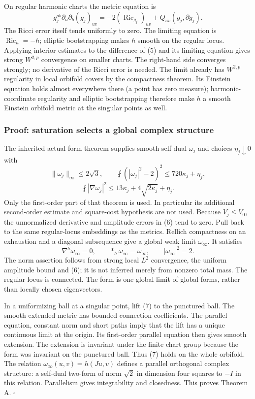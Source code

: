 \documentclass[
  11pt,
]{article}
\begin{document}
On regular harmonic charts the metric equation is \[
 g_j^{ab}\partial_a\partial_b(g_j)_{uv}
    =-2(\operatorname{Ric}_{g_j})_{uv}
                +Q_{uv}(g_j,\partial g_j).             \tag{5}
\] The Ricci error itself tends uniformly to zero. The limiting equation
is \(\operatorname{Ric}_h=-h\); elliptic bootstrapping makes \(h\)
smooth on the regular locus. Applying interior estimates to the
difference of (5) and its limiting equation gives strong \(W^{2,p}\)
convergence on smaller charts. The right-hand side converges strongly;
no derivative of the Ricci error is needed. The limit already has
\(W^{2,p}\) regularity in local orbifold covers by the compactness
theorem. Its Einstein equation holds almost everywhere there (a point
has zero measure); harmonic-coordinate regularity and elliptic
bootstrapping therefore make \(h\) a smooth Einstein orbifold metric at
the singular points as well.

\hypertarget{proof-saturation-selects-a-global-complex-structure}{%
\subsubsection{Proof: saturation selects a global complex
structure}\label{proof-saturation-selects-a-global-complex-structure}}

The inherited actual-form theorem supplies smooth self-dual \(\omega_j\)
and choices \(\eta_j\downarrow0\) with \[
 \|\omega_j\|_\infty\le2\sqrt3,\qquad
 \fint(|\omega_j|^2-2)^2\le720\kappa_j+\eta_j,
\] \[
 \fint|\nabla\omega_j|^2
       \le13\kappa_j+4\sqrt{2\kappa_j}+\eta_j.          \tag{6}
\] Only the first-order part of that theorem is used. In particular its
additional second-order estimate and square-cost hypothesis are not
used. Because \(V_j\le V_0\), the unnormalized derivative and amplitude
errors in (6) tend to zero. Pull back to the same regular-locus
embeddings as the metrics. Rellich compactness on an exhaustion and a
diagonal subsequence give a global weak limit \(\omega_\infty\). It
satisfies \[
 \nabla^h\omega_\infty=0,\qquad
 *_h\omega_\infty=\omega_\infty,\qquad
 |\omega_\infty|^2=2.                                  \tag{7}
\] The norm assertion follows from strong local \(L^2\) convergence, the
uniform amplitude bound and (6); it is not inferred merely from nonzero
total mass. The regular locus is connected. The form is one global limit
of global forms, rather than locally chosen eigenvectors.

In a uniformizing ball at a singular point, lift (7) to the punctured
ball. The smooth extended metric has bounded connection coefficients.
The parallel equation, constant norm and short paths imply that the lift
has a unique continuous limit at the origin. Its first-order parallel
equation then gives smooth extension. The extension is invariant under
the finite chart group because the form was invariant on the punctured
ball. Thus (7) holds on the whole orbifold. The relation
\(\omega_\infty(u,v)=h(Ju,v)\) defines a parallel orthogonal complex
structure: a self-dual two-form of norm \(\sqrt2\) in dimension four
squares to \(-I\) in this relation. Parallelism gives integrability and
closedness. This proves Theorem A. \(\square\)
\end{document}
